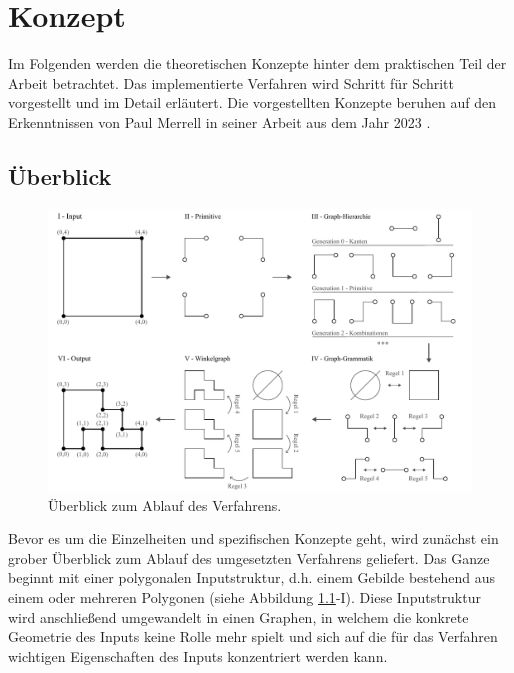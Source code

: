 %

\chapter{Konzept}
Im Folgenden werden die theoretischen Konzepte hinter dem praktischen Teil der Arbeit betrachtet. Das implementierte Verfahren wird
Schritt für Schritt vorgestellt und im Detail erläutert. Die vorgestellten Konzepte beruhen auf den Erkenntnissen von Paul Merrell
in seiner Arbeit aus dem Jahr 2023 \cite{1_merrell}.

\section{Überblick}

\begin{figure}[t]
    \centering
    \includegraphics[width=\imgWidth]{images/overview.pdf}
    \caption{Überblick zum Ablauf des Verfahrens.}
    \label{fig:overview}
\end{figure}

Bevor es um die Einzelheiten und spezifischen Konzepte geht, wird zunächst ein grober Überblick zum Ablauf des umgesetzten
Verfahrens geliefert. Das Ganze beginnt mit einer polygonalen Inputstruktur, d.h. einem Gebilde bestehend aus einem oder mehreren Polygonen
(siehe Abbildung \ref{fig:overview}-I).
Diese Inputstruktur wird anschließend umgewandelt in einen Graphen, in welchem die konkrete Geometrie des Inputs keine Rolle
mehr spielt und sich auf die für das Verfahren wichtigen Eigenschaften des Inputs konzentriert werden kann.


